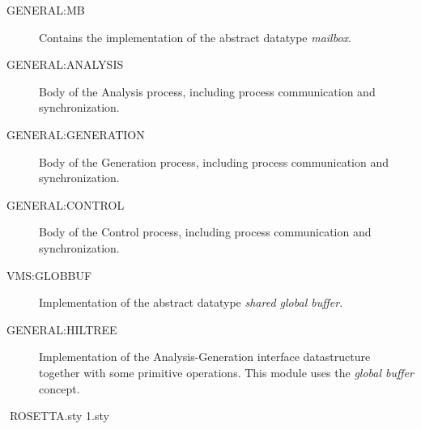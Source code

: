 \begin{description}
\item[GENERAL:MB] Contains the implementation of the abstract datatype {\em 
                  mailbox}.

\item[GENERAL:ANALYSIS] Body of the Analysis process, including process 
                  communication and synchronization. 

\item[GENERAL:GENERATION] Body of the Generation process, including process 
                  communication and synchronization. 

\item[GENERAL:CONTROL] Body of the Control process, including process 
                  communication and synchronization. 

\item[VMS:GLOBBUF] Implementation of the abstract datatype {\em shared global 
                  buffer}.

\item[GENERAL:HILTREE] Implementation of the Analysis-Generation interface 
                  datastructure together with some primitive operations. This
                  module uses the {\em global buffer} concept.
\end{description}


ROSETTA.sty
\def\@ptsize{1}
\@namedef{ds@10pt}{\def\@ptsize{0}}
\@namedef{ds@12pt}{\def\@ptsize{2}} 
\@twosidetrue
\@mparswitchtrue
\def\ds@draft{\overfullrule 5pt} 
\@options
\@ptsize.sty\relax


\def\labelenumi{\arabic{enumi}.} 
\def\theenumi{\arabic{enumi}} 
\def\labelenumii{(\alph{enumii})}
\def\theenumii{\alph{enumii}}
\def\p@enumii{\theenumi}
\def\labelenumiii{\roman{enumiii}.}
\def\theenumiii{\roman{enumiii}}
\def\p@enumiii{\theenumi(\theenumii)}
\def\labelenumiv{\Alph{enumiv}.}
\def\theenumiv{\Alph{enumiv}} 
\def\p@enumiv{\p@enumiii\theenumiii}
\def\labelitemi{$\bullet$}
\def\labelitemii{\bf --}
\def\labelitemiii{$\ast$}
\def\labelitemiv{$\cdot$}
\def\verse{
   \let\\=\@centercr 
   \list{}{\itemsep\z@ \itemindent -1.5em\listparindent \itemindent 
      \rightmargin\leftmargin\advance\leftmargin 1.5em}
   \item[]}
\let\endverse\endlist
\def\quotation{
   \list{}{\listparindent 1.5em
      \itemindent\listparindent
      \rightmargin\leftmargin \parsep 0pt plus 1pt}\item[]}
\let\endquotation=\endlist
\def\quote{
   \list{}{\rightmargin\leftmargin}\item[]}
\let\endquote=\endlist
\def\descriptionlabel#1{\hspace\labelsep \bf #1}
\def\description{
   \list{}{\labelwidth\z@ \itemindent-\leftmargin
      \let\makelabel\descriptionlabel}}
\let\enddescription\endlist


